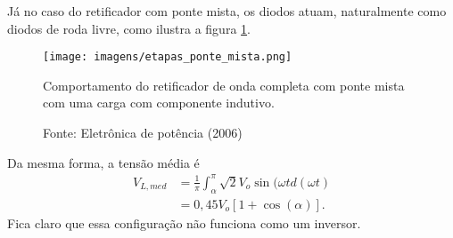 Já no caso do retificador com ponte mista, os diodos atuam, naturalmente como diodos de roda livre, como ilustra a figura \ref{epm}.

\begin{figure}[h]
\center
\texttt{[image: imagens/etapas\_ponte\_mista.png]}
\caption{Comportamento do retificador de onda completa com ponte mista com uma carga com componente indutivo.}\label{epm}
\caption*{Fonte: Eletrônica de potência (2006)}
\end{figure}

Da mesma forma, a tensão média é 
\begin{align*}
 V_{L,med} &= \frac{1}{\pi}\int_{\alpha}^{\pi}\sqrt{2}V_{o}\sin(\omega{t}d(\omega{t}) \\
 &= 0,45V_{o}[1+\cos(\alpha)]
.\end{align*}
Fica claro que essa configuração não funciona como um inversor.

